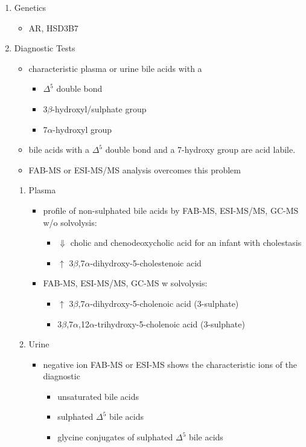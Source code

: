 \documentclass{scrartcl}
\begin{document}
\begin{enumerate}
\item Genetics
\label{sec:orgd78b758}
\begin{itemize}
\item AR, HSD3B7
\end{itemize}

\item Diagnostic Tests
\label{sec:org907d95d}
\begin{itemize}
\item characteristic plasma or urine bile acids with a
\begin{itemize}
\item \(\Delta^{\text{5}}\) double bond
\item 3\(\beta\)-hydroxyl/sulphate group
\item 7\(\alpha\)-hydroxyl group
\end{itemize}
\item bile acids with a \(\Delta^{\text{5}}\) double bond and a 7-hydroxy group are acid labile.
\item FAB-MS or ESI-MS/MS analysis overcomes this problem
\end{itemize}

\begin{enumerate}
\item Plasma
\label{sec:org597112b}
\begin{itemize}
\item profile of non-sulphated bile acids by FAB-MS, ESI-MS/MS, GC-MS w/o solvolysis:
\begin{itemize}
\item \(\Downarrow\) cholic and chenodeoxycholic acid for an infant with cholestasis
\item \(\uparrow\) 3\(\beta\),7\(\alpha\)-dihydroxy-5-cholestenoic acid
\end{itemize}
\item FAB-MS, ESI-MS/MS, GC-MS w solvolysis:
\begin{itemize}
\item \(\uparrow\) 3\(\beta\),7\(\alpha\)-dihydroxy-5-cholenoic acid (3-sulphate)
\item 3\(\beta\),7\(\alpha\),12\(\alpha\)-trihydroxy-5-cholenoic acid (3-sulphate)
\end{itemize}
\end{itemize}

\item Urine
\label{sec:orged9e7f8}
\begin{itemize}
\item negative ion FAB-MS or ESI-MS shows the characteristic ions of the
diagnostic
\begin{itemize}
\item unsaturated bile acids
\item sulphated \(\Delta^{\text{5}}\) bile acids
\item glycine conjugates of sulphated \(\Delta^{\text{5}}\) bile acids
\end{itemize}
\end{itemize}


\end{enumerate}
\end{enumerate}
\end{document}
